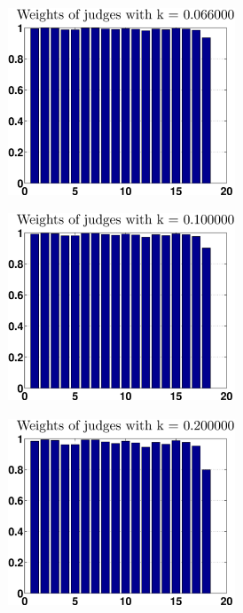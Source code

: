\documentclass[12pt,a4paper]{article}
\begin{document}
\begin{figure}
\centering
\begin{subfigure}[b]{0.48\textwidth}
\includegraphics[width = 6cm]{preprocess/ppweightsk660.eps}
\end{subfigure}
\begin{subfigure}[b]{0.48\textwidth}
\includegraphics[width = 6cm]{preprocess/ppweightsk1000.eps}
\end{subfigure}
\begin{subfigure}[b]{0.5\textwidth}
\includegraphics[width = 6cm]{preprocess/ppweightsk2000.eps}
\end{subfigure}
\label{weightprocess}
\end{figure}
\end{document}
